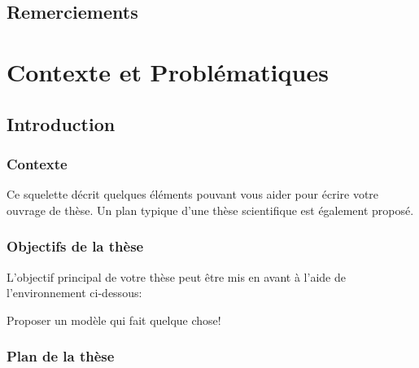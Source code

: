 \documentclass[french]{spimutbmphdthesis}
\begin{document}
 

\chapter*{Remerciements}
 
\tableofcontents

\mainmatter
 
\part{Contexte et Problématiques}

\chapter{Introduction}
 
\section{Contexte}

Ce squelette décrit quelques éléments pouvant vous aider pour écrire votre ouvrage de thèse.
Un plan typique d'une thèse scientifique est également proposé.

\section{Objectifs de la thèse}

L'objectif principal de votre thèse peut être mis en avant à l'aide de l'environnement ci-dessous:

\begin{emphbox}
	Proposer un modèle qui fait quelque chose!
\end{emphbox}

\section{Plan de la thèse}
\end{document}
